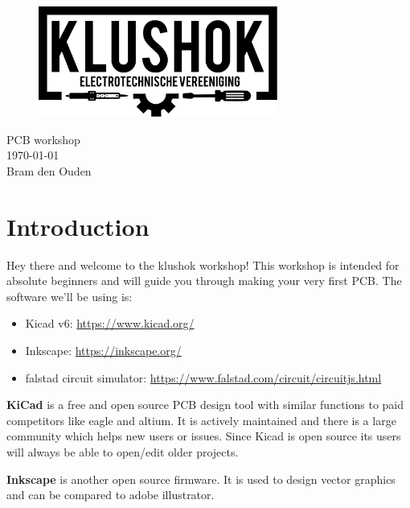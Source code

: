 \documentclass[12pt]{article}
\begin{document}
\raggedright
\reversemarginpar

\begin{figure}[H]
	\centering
	\includegraphics[width=0.7\textwidth]{../images/klushok-logo.pdf} %
\end{figure}

\begin{center}
	\LARGE{PCB workshop}\\
	\large{\today}\\
	\normalsize{Bram den Ouden}\\
\end{center}




\section{Introduction}

Hey there and welcome to the klushok workshop!
This workshop is intended for absolute beginners and will guide you through making your very first PCB.
The software we'll be using is:
\begin{itemize}
	\item Kicad v6: \url{https://www.kicad.org/}
	\item Inkscape: \url{https://inkscape.org/}
	\item falstad circuit simulator: \url{https://www.falstad.com/circuit/circuitjs.html}
\end{itemize}

\textbf{KiCad} is a free and open source PCB design tool with similar functions to paid competitors like eagle and altium. It is actively maintained and there is a large community which helps new users or issues. Since Kicad is open source its users will always be able to open/edit older projects.

\textbf{Inkscape} is another open source firmware. It is used to design vector graphics and can be compared to adobe illustrator.
\end{document}
